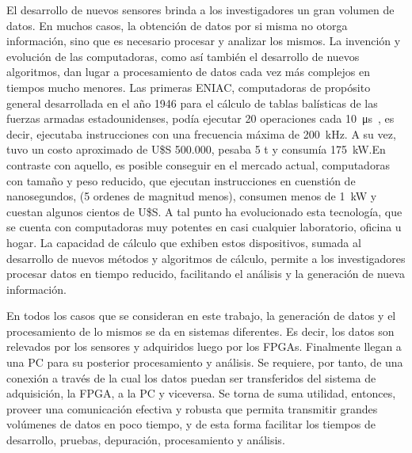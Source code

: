 El desarrollo de nuevos sensores brinda a los investigadores un gran volumen de datos. En muchos casos, la obtención de datos por si misma no otorga información, sino que es necesario procesar y analizar los mismos. La invención y evolución de las computadoras, como así también el desarrollo de nuevos algoritmos, dan lugar a procesamiento de datos cada vez más complejos en tiempos mucho menores.
Las primeras ENIAC, computadoras de propósito general desarrollada en el año 1946 para el cálculo de tablas balísticas de las fuerzas armadas estadounidenses, podía ejecutar 20 operaciones cada \SI{10}{\micro\second}~\cite{Goldstine1946}, es decir, ejecutaba instrucciones con una frecuencia máxima de \SI{200}{\kilo\hertz}. A su vez, tuvo un costo aproximado de U\$S 500.000, pesaba 5 t y consumía \SI{175}{\kilo\watt}.En contraste con aquello, es posible conseguir en el mercado actual, computadoras con tamaño y peso reducido, que ejecutan instrucciones en cuenstión de nanosegundos, (5 ordenes de magnitud menos), consumen menos de \SI{1}{\kilo\watt} y cuestan algunos cientos de U\$S. A tal punto ha evolucionado esta tecnología, que se cuenta con computadoras muy potentes en casi cualquier laboratorio, oficina u hogar. La capacidad de cálculo que exhiben estos dispositivos, sumada al desarrollo de nuevos métodos y algoritmos de cálculo, permite a los investigadores procesar datos en tiempo reducido, facilitando el análisis y la generación de nueva información.%

En todos los casos que se consideran en este trabajo, la generación de datos y el procesamiento de lo mismos se da en sistemas diferentes. Es decir, los datos son relevados por los sensores y adquiridos luego por los FPGAs. Finalmente llegan a una PC para su posterior procesamiento y análisis. Se requiere, por tanto, de una conexión a través de la cual los datos puedan ser transferidos del sistema de adquisición, la FPGA, a la PC y viceversa. Se torna de suma utilidad, entonces, proveer una comunicación efectiva y robusta que permita transmitir grandes volúmenes de datos en poco tiempo, y de esta forma facilitar los tiempos de desarrollo, pruebas, depuración, procesamiento y análisis.%

